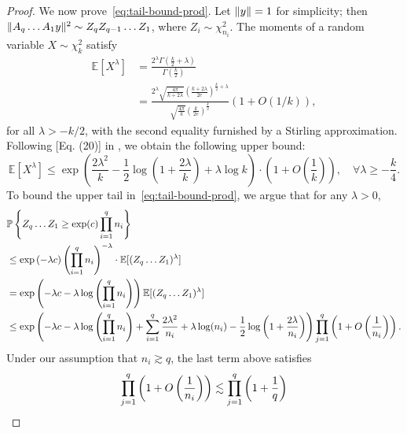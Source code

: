 \begin{proof}
	\noindent We now prove~\cref{eq:tail-bound-prod}. Let $\lVert y\rVert = 1$ for simplicity;
	then $\lVert A_q \dots A_1 y\rVert^2 \sim Z_{q} Z_{q-1} \dots Z_{1}$, where $Z_{i} \sim \chi^2_{n_i}$.
	The moments of a random variable $X \sim \chi^2_{k}$ satisfy
	\begin{align*}
		\mathbb{E}[X^{\lambda}] & = \frac{2^{\lambda} \Gamma(\frac{k}{2} + \lambda)}{\Gamma(\frac{k}{2})} \\
		                        & =
		\frac{2^{\lambda} \sqrt{\frac{4 \pi}{k + 2 \lambda}} \left(\frac{k + 2\lambda}{2e}\right)^{\frac{k}{2} + \lambda}}{
		\sqrt{\frac{4 \pi}{k}} \left(\frac{k}{2e}\right)^{\frac{k}{2}}
		} \left(1 + O(1 / k)\right),
	\end{align*}
	for all $\lambda > -k/2$, with the second equality furnished by a Stirling approximation.
	Following [Eq. (20)] in \cite{du2019width}, we obtain the following upper bound:
	\begin{equation}
		\mathbb{E}[X^{\lambda}] \leq
		\exp\left(
		\frac{2 \lambda^2}{k} - \frac{1}{2} \log\left(1 + \frac{2\lambda}{k}\right)
		+ \lambda \log k
		\right) \cdot \left(1 + O\left(\frac{1}{k}\right)\right),
		\quad \forall \lambda \geq -\frac{k}{4}.
		\label{eq:stirling-ub-chi2}
	\end{equation}
	To bound the upper tail in~\cref{eq:tail-bound-prod}, we argue that for any $\lambda > 0$,
	\begin{align}
		 & \mathbb{P}\left\{ {Z_q \dots Z_1 \geq \exp(c) \prod_{i=1}^q n_i} \right\}                                                           \notag \\
		 & \leq
		\exp\left(-\lambda c\right) \left(\prod_{i=1}^q n_i\right)^{-\lambda} \cdot
		\mathbb{E}[(Z_q \dots Z_1)^{\lambda}]                                                                            \notag \\
		 & =
		\exp\left(-\lambda c - \lambda \log\left( \prod_{i=1}^q n_i \right)\right) \mathbb{E}[(Z_q \dots Z_1)^{\lambda}] \notag \\
		 & \leq
		\exp\left(-\lambda c - \lambda \log\left( \prod_{i=1}^q n_i \right)
		+ \sum_{i=1}^q \frac{2 \lambda^2}{n_i} + \lambda \log(n_i) - \frac{1}{2} \log\left(1 + \frac{2\lambda}{n_i}\right)
		\right) \prod_{j=1}^q \left(1 + O\left(\frac{1}{n_i}\right)\right).
		\label{eq:Z-chernoff-ub}
	\end{align}
	Under our assumption that $n_i \gtrsim q$, the last term above satisfies
	\begin{align}
		\prod_{j=1}^q \left(1 + O\left(\frac{1}{n_i}\right)\right) & \lesssim
		\prod_{j=1}^q \left(1 + \frac{1}{q}\right) \notag                       \\

\end{align}
\end{proof}
